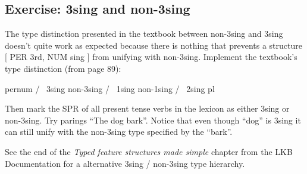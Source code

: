 \subsection{Exercise: 3sing and non-3sing}

The type distinction presented in the textbook between non-3sing and 3sing doesn't quite work as expected because there is nothing that prevents a structure [ PER 3rd, NUM sing ] from unifying with non-3sing.  Implement the textbook's type distinction (from page 89):

\begin{cprog}
        pernum
        /    \
    3sing   non-3sing
            /       \
          1sing  non-1sing
                 /       \
               2sing      pl 
\end{cprog}

Then mark the SPR of all present tense verbs in the lexicon as either 3sing or non-3sing.  Try parings ``The dog bark''.  Notice that even though ``dog'' is 3sing it can still unify with the non-3sing type specified by the ``bark''.

See the end of the \emph{Typed feature structures made simple} chapter from the LKB Documentation for a alternative 3sing / non-3sing type hierarchy.


